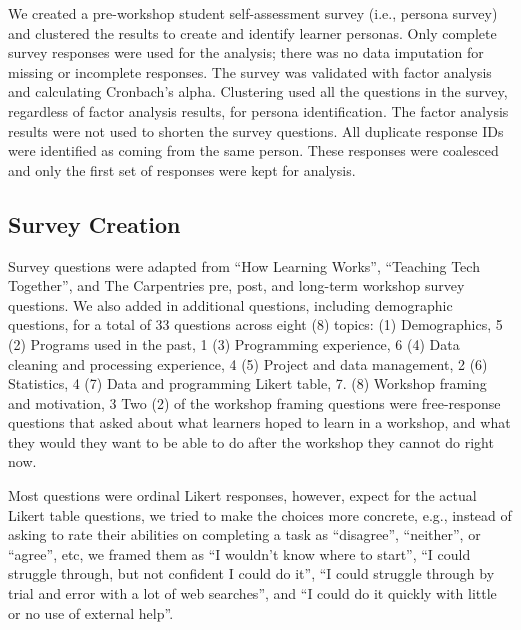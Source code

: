 \documentclass[020-persona\_validation.tex]{subfiles}
\begin{document}
    We created a pre-workshop student self-assessment survey (i.e., persona survey)
    and clustered the results to create and identify learner personas.
    Only complete survey responses were used for the analysis;
    there was no data imputation for missing or incomplete responses.
    The survey was validated with factor analysis and calculating Cronbach's alpha.
    Clustering used all the questions in the survey,
    regardless of factor analysis results,
    for persona identification.
    The factor analysis results were not used to shorten the survey questions.
    All duplicate response IDs were identified as coming from the same person.
    These responses were coalesced and only the first set of responses were kept for analysis.

    \subsection{Survey Creation}

        Survey questions were adapted from
        ``How Learning Works'',
        ``Teaching Tech Together'', and
        The Carpentries pre, post, and long-term workshop survey questions. %
        We also added in additional questions, including demographic questions,
        for a total of 33 questions across eight (8) topics:
        (1) Demographics, 5
        (2) Programs used in the past, 1
        (3) Programming experience, 6
        (4) Data cleaning and processing experience, 4
        (5) Project and data management, 2
        (6) Statistics, 4
        (7) Data and programming Likert table, 7.
        (8) Workshop framing and motivation, 3
        Two (2) of the workshop framing questions were free-response questions that asked about
        what learners hoped to learn in a workshop,
        and what they would they want to be able to do after the workshop they cannot do right now.

        Most questions were ordinal Likert responses, however,
        expect for the actual Likert table questions,
        we tried to make the choices more concrete,
        e.g., instead of asking to rate their abilities on completing a task as
        ``disagree'', ``neither'', or ``agree'', etc,
        we framed them as ``I wouldn't know where to start'',
        ``I could struggle through, but not confident I could do it'',
        ``I could struggle through by trial and error with a lot of web searches'',
        and
        ``I could do it quickly with little or no use of external help''.
\end{document}
